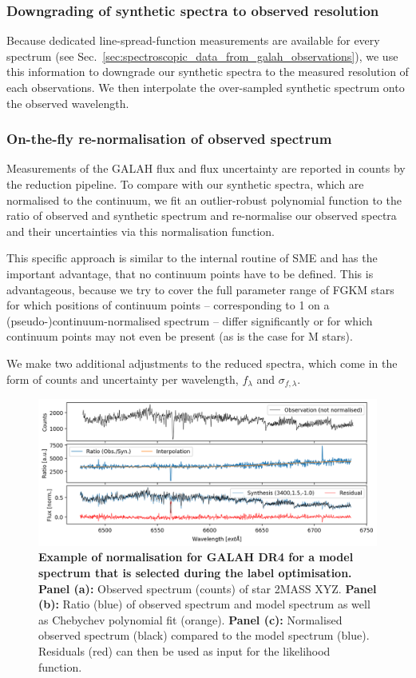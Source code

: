 \documentclass[
  journal=pasa,
  manuscript=research-paper, %
  year=2023,
  volume=37
]{cup-journal}
\begin{document}
\subsubsection{Downgrading of synthetic spectra to observed resolution}

Because dedicated line-spread-function measurements are available for every spectrum (see Sec.~\ref{sec:spectroscopic_data_from_galah_observations}), we use this information to downgrade our synthetic spectra to the measured resolution of each observations. We then interpolate the over-sampled synthetic spectrum onto the observed wavelength.

\subsubsection{On-the-fly re-normalisation of observed spectrum}

Measurements of the GALAH flux and flux uncertainty are reported in counts by the reduction pipeline. To compare with our synthetic spectra, which are normalised to the continuum, we fit an outlier-robust polynomial function to the ratio of observed and synthetic spectrum and re-normalise our observed spectra and their uncertainties via this normalisation function.

This specific approach is similar to the internal routine of \textsc{SME} \citep{Piskunov2017} and has the important advantage, that no continuum points have to be defined. This is advantageous, because we try to cover the full parameter range of FGKM stars for which positions of continuum points -- corresponding to 1 on a (pseudo-)continuum-normalised spectrum -- differ significantly or for which continuum points may not even be present (as is the case for M stars).

We make two additional adjustments to the reduced spectra, which come in the form of counts and uncertainty per wavelength, $f_\lambda$ and $\sigma_{f,\lambda}$.

\begin{figure}[ht]
\centering
\includegraphics[width=\textwidth]{figures/Nuisance_example.png}
\caption{
\textbf{Example of normalisation for GALAH DR4 for a model spectrum that is selected during the label optimisation.}
\textbf{Panel (a):} Observed spectrum (counts) of star 2MASS XYZ.
\textbf{Panel (b):} Ratio (blue) of observed spectrum and model spectrum as well as Chebychev polynomial fit (orange).
\textbf{Panel (c):} Normalised observed spectrum (black) compared to the model spectrum (blue). Residuals (red) can then be used as input for the likelihood function.
}
\label{fig:ratio_normalisation}
\end{figure}
\end{document}
